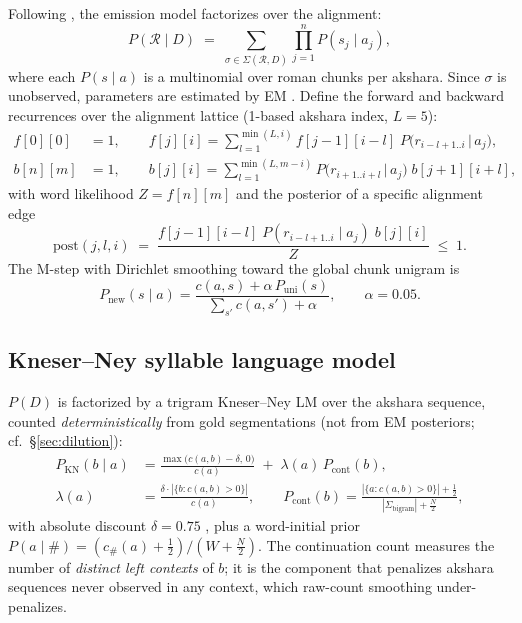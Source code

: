 \documentclass[11pt,a4paper]{article}
\newcommand{\R}{\mathcal{R}}
\newcommand{\Sg}{\Sigma}
\begin{document}
Following \citet{li2004}, the emission model factorizes over the alignment:
\begin{equation}
P(\R \mid D) \;=\; \sum_{\sigma \in \Sg(\R,D)} \prod_{j=1}^{n} P(s_j \mid a_j),
\label{eq:emission}
\end{equation}
where each $P(s \mid a)$ is a multinomial over roman chunks per akshara.
Since $\sigma$ is unobserved, parameters are estimated by EM
\citep{dempster1977}. Define the forward and backward recurrences over the
alignment lattice (1-based akshara index, $L = 5$):
\begin{align}
f[0][0] &= 1, \qquad
f[j][i] = \sum_{l=1}^{\min(L,i)} f[j{-}1][i{-}l]\; P\big(r_{i-l+1..i} \,\big|\, a_j\big),\\
b[n][m] &= 1, \qquad
b[j][i] = \sum_{l=1}^{\min(L,m-i)} P\big(r_{i+1..i+l} \,\big|\, a_j\big)\; b[j{+}1][i{+}l],
\end{align}
with word likelihood $Z = f[n][m]$ and the posterior of a specific alignment
edge
\begin{equation}
\mathrm{post}(j, l, i) \;=\; \frac{f[j{-}1][i{-}l]\; P(r_{i-l+1..i} \mid a_j)\; b[j][i]}{Z}
\;\le\; 1 .
\label{eq:post}
\end{equation}
The M-step with Dirichlet smoothing toward the global chunk unigram is
\begin{equation}
P_{\mathrm{new}}(s \mid a) = \frac{c(a,s) + \alpha\, P_{\mathrm{uni}}(s)}
{\sum_{s'} c(a,s') + \alpha}, \qquad \alpha = 0.05 .
\end{equation}

\subsection{Kneser--Ney syllable language model}

$P(D)$ is factorized by a trigram Kneser--Ney LM \citep{kneserney1995} over
the akshara sequence, counted \emph{deterministically} from gold
segmentations (not from EM posteriors; cf.\ \S\ref{sec:dilution}):
\begin{align}
P_{\mathrm{KN}}(b \mid a) &= \frac{\max\big(c(a,b) - \delta,\, 0\big)}{c(a)}
\;+\; \lambda(a)\, P_{\mathrm{cont}}(b),\\
\lambda(a) &= \frac{\delta \cdot |\{b : c(a,b) > 0\}|}{c(a)}, \qquad
P_{\mathrm{cont}}(b) = \frac{|\{a : c(a,b) > 0\}| + \tfrac12}{|\Sg_{\mathrm{bigram}}| + \tfrac{N}{2}},
\end{align}
with absolute discount $\delta = 0.75$ \citep{kneserney1995}, plus a
word-initial prior $P(a \mid \#) = (c_\#(a) + \tfrac12)/(W + \tfrac{N}{2})$.
The continuation count measures the number of \emph{distinct left contexts}
of $b$; it is the component that penalizes akshara sequences never observed
in any context, which raw-count smoothing under-penalizes.
\end{document}
